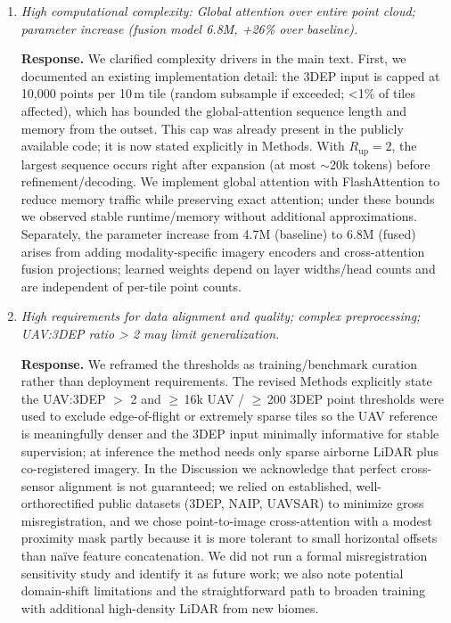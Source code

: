 \documentclass[11pt]{article}
\newcommand{\response}{\textbf{Response.} }
\begin{document}
\begin{enumerate}
  \item \emph{High computational complexity: Global attention over entire point cloud; parameter increase (fusion model 6.8M, +26\% over baseline).}

  \response We clarified complexity drivers in the main text. First, we documented an existing implementation detail: the 3DEP input is capped at 10,000 points per 10\,m tile (random subsample if exceeded; \textless{}1\% of tiles affected), which has bounded the global-attention sequence length and memory from the outset. This cap was already present in the publicly available code; it is now stated explicitly in Methods. With $R_{\text{up}}{=}2$, the largest sequence occurs right after expansion (at most $\sim$20k tokens) before refinement/decoding. We implement global attention with FlashAttention to reduce memory traffic while preserving exact attention; under these bounds we observed stable runtime/memory without additional approximations. Separately, the parameter increase from 4.7M (baseline) to 6.8M (fused) arises from adding modality-specific imagery encoders and cross-attention fusion projections; learned weights depend on layer widths/head counts and are independent of per-tile point counts.

  \item \emph{High requirements for data alignment and quality; complex preprocessing; UAV:3DEP ratio > 2 may limit generalization.}

  \response We reframed the thresholds as training/benchmark curation rather than deployment requirements. The revised Methods explicitly state the UAV:3DEP $>$ 2 and $\geq$\,16k UAV / $\geq$\,200 3DEP point thresholds were used to exclude edge-of-flight or extremely sparse tiles so the UAV reference is meaningfully denser and the 3DEP input minimally informative for stable supervision; at inference the method needs only sparse airborne LiDAR plus co-registered imagery. In the Discussion we acknowledge that perfect cross-sensor alignment is not guaranteed; we relied on established, well-orthorectified public datasets (3DEP, NAIP, UAVSAR) to minimize gross misregistration, and we chose point-to-image cross-attention with a modest proximity mask partly because it is more tolerant to small horizontal offsets than naïve feature concatenation. We did not run a formal misregistration sensitivity study and identify it as future work; we also note potential domain-shift limitations and the straightforward path to broaden training with additional high-density LiDAR from new biomes.
\end{enumerate}
\end{document}
